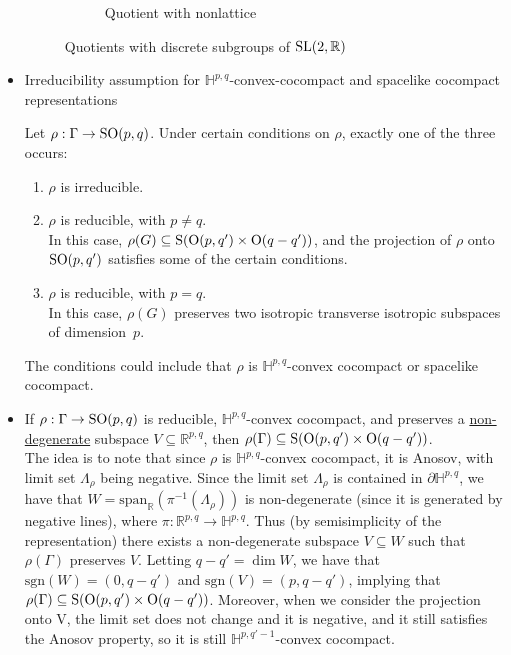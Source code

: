 \documentclass{report}
\begin{document}
\begin{itemize}
\begin{figure}[ht]
\begin{subfigure}[b]{0.3\textwidth}
            \caption{Quotient with nonlattice}
            \label{fig:nonlattice}
        \end{subfigure}
        \caption{Quotients with discrete subgroups of $\operatorname{{\mathrm{SL}}}(2,\mathbb R)$}
        \label{fig:quotients_SL2R}
    \end{figure}
    \item Irreducibility assumption for $\mathbb H^{p,q}$-convex-cocompact and spacelike cocompact representations
    \begin{lemma}
        Let $\rho: \Gamma \to \operatorname{{\mathrm{SO}}}(p,q)$.
        Under certain conditions on $\rho$, exactly one of the three occurs:
        \begin{enumerate}[label=(\roman*)]
            \item $\rho$ is irreducible.
            \item $\rho$ is reducible, with $p \neq q$.\\
            In this case, $\rho(G) \subseteq \mathrm{S}(\operatorname{{\mathrm{O}}}(p, q') \times \operatorname{{\mathrm{O}}}(q - q'))$, and the projection of $\rho$ onto $\operatorname{{\mathrm{SO}}}(p,q')$ satisfies some of the certain conditions.
            \item $\rho$ is reducible, with $p = q$.\\
            In this case, $\rho(G)$ preserves two isotropic transverse isotropic subspaces of dimension~$p$.
        \end{enumerate}
    \end{lemma}
    The conditions could include that $\rho$ is $\mathbb H^{p,q}$-convex cocompact or spacelike cocompact.
    \item If $\rho: \Gamma \to \operatorname{{\mathrm{SO}}}(p,q)$ is reducible, $\mathbb H^{p,q}$-convex cocompact, and preserves a \underline{non-degenerate} subspace $V \subseteq \mathbb R^{p,q}$, then $\rho(\Gamma) \subseteq \mathrm{S}(\operatorname{{\mathrm{O}}}(p,q') \times \operatorname{{\mathrm{O}}}(q - q'))$.\\
    The idea is to note that since $\rho$ is $\mathbb H^{p,q}$-convex cocompact, it is Anosov, with limit set $\Lambda_\rho$ being negative.
    Since the limit set $\Lambda_\rho$ is contained in $\partial \mathbb H^{p,q}$, we have that $W = \mathrm{span}_\mathbb R (\pi^{-1}(\Lambda_\rho))$ is non-degenerate (since it is generated by negative lines), where $\pi: \mathbb R^{p,q} \to \mathbb H^{p,q}$.
    Thus (by semisimplicity of the representation) there exists a non-degenerate subspace $V \subseteq W$ such that $\rho(\Gamma)$ preserves $V$.
    Letting $q-q'= \dim W$, we have that $\mathrm{sgn}(W) = (0, q-q')$ and $\mathrm{sgn}(V) = (p, q-q')$, implying that $\rho(\Gamma) \subseteq \mathrm{S}(\operatorname{{\mathrm{O}}}(p,q') \times \operatorname{{\mathrm{O}}}(q - q'))$.
    Moreover, when we consider the projection onto V, the limit set does not change and it is negative, and it still satisfies the Anosov property, so it is still $\mathbb H^{p,q'-1}$-convex cocompact.
\end{itemize}
\end{document}
